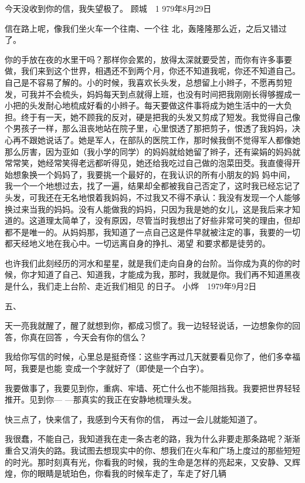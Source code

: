 \documentclass{article}
\begin{document}
今天没收到你的信，我失望极了。 顾城　1
979年8月29日 


\newpage


信在路上呢，像我们坐火车一个往南、一个往
北，轰隆隆那么近，之后又错过了。 

你的手放在夜的水里干吗？那样你会累的，放得太深就要受苦，而你有许多事要做，我们来到这个世界，相遇还不到两个月，你还不知道我呢，你还不知道自己。自己是不容易了解的。小的时候，我喜欢长头发，总想留上小辫子，不愿再剪短发，可我并不会梳头，妈妈每天到点就得上班，也没有时间把我刚刚长得够握成一小把的头发耐心地梳成好看的小辫子。每天要做这件事将成为她生活中的一大负担。终于有一天，她不顾我的反对，硬是把我的头发又剪成了短发。我觉得自己像个男孩子一样，那么沮丧地站在院子里，心里恨透了那把剪子，恨透了我妈妈，决心再不跟她说话了。她是军人，在部队的医院工作，那时候我倒不觉得军人都像她那么厉害，因为亚如（我小学的同学）的妈妈就给她留了辫子，还有粱娟的妈妈就常常笑，她经常笑得老远都听得见，她还给我吃过自己做的泡菜田茭。我直傻得开始想象换一个妈妈了，我要挑一个最好的，在我认识的所有小朋友的妈
\newpage
妈中间，我一个一个地想过去，找了一遍，结果却全都被我自己否定了，这时我已经忘记了头发，可我还在无名地恨着我妈妈，不过我又不得不承认：我没有发现一个人能够换过来当我的妈妈。没有人能做我的妈妈，只因为我是她的女儿，这是我后来才知道的。这道理太简单了，没有原因，尽管当时我想出了好些非常可笑的理由，但却都不是唯一的。从妈妈那，我知道了一点自己这是件早就被注定的事，我要的一切都天经地义地在我心中。一切远离自身的挣扎、渴望
和要求都是徒劳的。 

也许我们此刻经历的河水和星星，就是我们走向自身的台阶。当你成为真的你的时候，你才知道了自己、知道我，才能成为我，那时，我就是你。我们再不知道黑夜是什么，我们走上台阶、走近我们相见
的日子。 小烨　1979年9月2日 

五、
 


\newpage

天一亮我就醒了，醒了就想到你，都成习惯了。我一边轻轻说话，一边想象你的回答，你真在回答
，今天会有你的信么？ 

我给你写信的时候，心里总是挺奇怪：这些字再过几天就要看见你了，他们多幸福呵，我要是也能
变成一个字就好了（即使是一个白字）。 

我要做事了，我要见到你，重病、牢墙、死亡什么也不能阻挡我。我要把世界轻轻推开。见到你—
—那真实的我正在安静地梳理头发。 

快三点了，快来信了，我感到今天有你的信，
再过一会儿就能知道了。 

我很蠢，不能自己，我知道我在走一条古老的路，我为什么非要走那条路呢？渐渐重合又消失的路。我试图去想现实中的你、想我们在火车和广场上度过的那些短短的时光。那时刻真有光，你看我的时候，我的生命是怎样的亮起来，又安静、又辉煌，你的眼睛是琥珀色，你看我的时候车走了，车走了好几辆
\newpage
\end{document}
